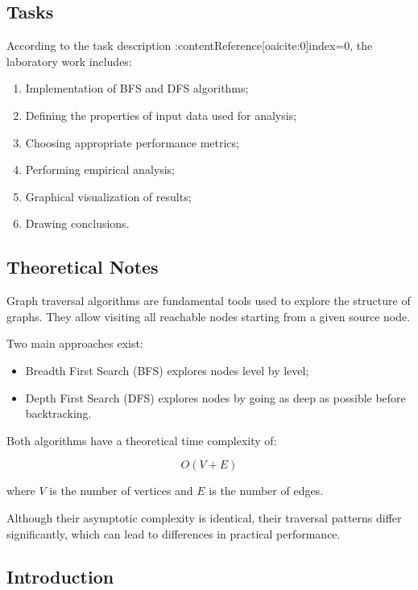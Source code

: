 \documentclass[12pt]{article}
\begin{document}
\subsection{Tasks}

According to the task description :contentReference[oaicite:0]{index=0}, the laboratory work includes:

\begin{enumerate}
    \item Implementation of BFS and DFS algorithms;
    \item Defining the properties of input data used for analysis;
    \item Choosing appropriate performance metrics;
    \item Performing empirical analysis;
    \item Graphical visualization of results;
    \item Drawing conclusions.
\end{enumerate}

\subsection{Theoretical Notes}

Graph traversal algorithms are fundamental tools used to explore the structure of graphs. They allow visiting all reachable nodes starting from a given source node.

Two main approaches exist:

\begin{itemize}
    \item Breadth First Search (BFS) explores nodes level by level;
    \item Depth First Search (DFS) explores nodes by going as deep as possible before backtracking.
\end{itemize}

Both algorithms have a theoretical time complexity of:

\[
O(V + E)
\]

where \(V\) is the number of vertices and \(E\) is the number of edges.

Although their asymptotic complexity is identical, their traversal patterns differ significantly, which can lead to differences in practical performance.

\subsection{Introduction}
\end{document}
